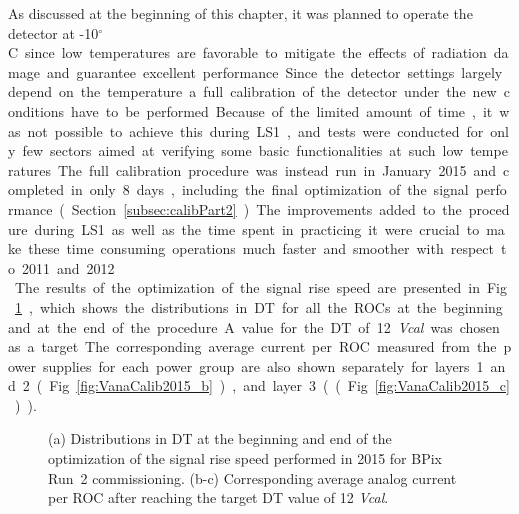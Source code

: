 As discussed at the beginning of this chapter, it was planned to operate the detector at -10\unit{$^\circ$C} since low temperatures
are favorable to mitigate the effects of radiation damage and guarantee excellent performance.
Since the detector settings largely depend on the temperature a full calibration of the detector under the new conditions have to be performed.
Because of the limited amount of time, it was not possible to achieve this during LS1, and tests were conducted for only few sectors aimed at verifying some basic functionalities at such low temperatures.
The full calibration procedure was instead run in January 2015 and completed in only 8 days, including the final optimization of the signal performance (Section~\ref{subsec:calibPart2}).
The improvements added to the procedure during LS1 as well as the time spent in practicing it 
were crucial to make these time consuming operations much faster and smoother with respect to 2011 and 2012.\\

The results of the optimization of the signal rise speed are presented in Fig.~\ref{fig:VanaCalib2015}, which shows the 
distributions in DT for all the ROCs at the beginning and at the end of the procedure. A value for the DT of 12 \textit{Vcal} was chosen as a target.
The corresponding average current per ROC measured from the power supplies for each power group are also shown separately for layers 1 and 2 (Fig.~\ref{fig:VanaCalib2015_b}), and layer 3 ((Fig.~\ref{fig:VanaCalib2015_c})).

\begin{figure}[!htb]
 \begin{center}
 \end{center}
 \caption{(a) Distributions in DT at the beginning and end of the optimization of the signal rise speed performed in 2015 for BPix Run~2 commissioning. (b-c) Corresponding average analog current per ROC after reaching the target DT value of 12 \textit{Vcal}.}
 \label{fig:VanaCalib2015}
\end{figure}

